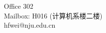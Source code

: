 \begin{frame}[noframenumbering]
  \centerline{\large {}}


  \begin{center}
	{\large
	  Office 302 \\[5pt]
	  Mailbox: H016 (计算机系楼二楼) \\[5pt]
	  hfwei@nju.edu.cn }
  \end{center}
\end{frame}
